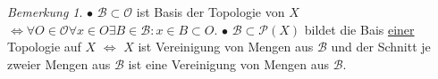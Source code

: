 \documentclass[a4paper,11pt,notitlepage]{report}
\theoremstyle{remark}
\newtheorem{remark}{Bemerkung}[chapter]
\theoremstyle{definition}
\newcommand{\OO}{{\ensuremath{\mathcal{O}}}}
\begin{document}
\begin{remark}
	$\bullet$ $\mathcal{B} \subset \OO$ ist Basis der Topologie von $X$ $\Leftrightarrow \forall O \in \OO \forall x \in O \exists B \in \mathcal{B} \colon x \in B \subset O$.
	\newline
	$\bullet$ $\mathcal{B} \subset \mathcal{P}(X)$ bildet die Bais \underline{einer} Topologie auf $X$ $\Leftrightarrow$ $X$ ist Vereinigung von Mengen aus $\mathcal{B}$ und der Schnitt je zweier Mengen aus $\mathcal{B}$ ist eine Vereinigung von Mengen aus $\mathcal{B}$.
	\newline
	\begin{figure}[h]
		\centering
		\qquad
	\end{figure}
\end{remark}
\end{document}
